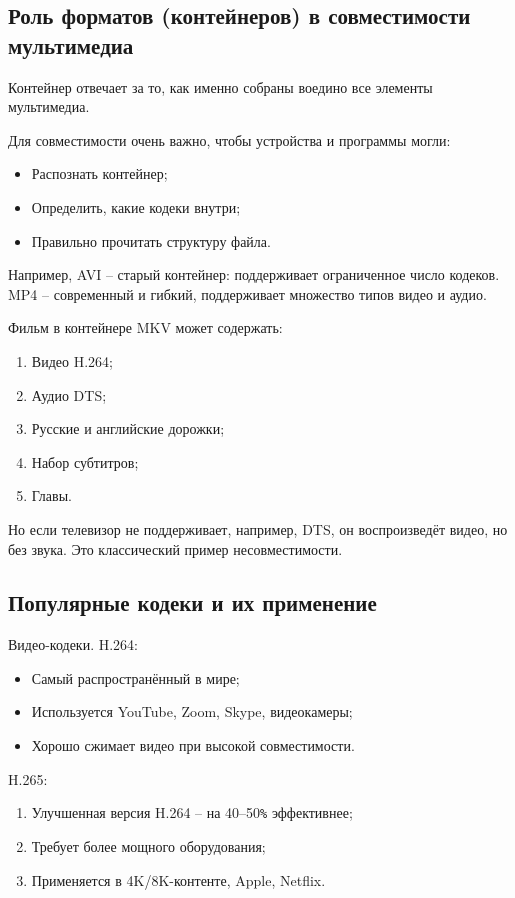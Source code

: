 \documentclass{ou}
\begin{document}
\subsection{Роль форматов (контейнеров) в совместимости мультимедиа}
Контейнер отвечает за то, как именно собраны воедино все элементы мультимедиа.

Для совместимости очень важно, чтобы устройства и программы могли:
\begin{itemize}[label=-, leftmargin=0em, itemindent=3.35em, nosep]
\item Распознать контейнер;
\item Определить, какие кодеки внутри;
\item Правильно прочитать структуру файла.
\end{itemize}

Например, AVI -- старый контейнер: поддерживает ограниченное число кодеков. MP4 -- современный и гибкий, поддерживает множество типов видео и аудио.

Фильм в контейнере MKV может содержать:
\begin{enumerate}[leftmargin=0em, itemindent=3.75em, nosep, label=\arabic*)]
\item Видео H.264;
\item Аудио DTS;
\item Русские и английские дорожки;
\item Набор субтитров;
\item Главы.
\end{enumerate}

Но если телевизор не поддерживает, например, DTS, он воспроизведёт видео, но без звука. Это классический пример несовместимости.
\subsection{Популярные кодеки и их применение}
Видео-кодеки. H.264:
\begin{itemize}[label=-, leftmargin=0em, itemindent=3.35em, nosep]
\item Самый распространённый в мире;
\item Используется YouTube, Zoom, Skype, видеокамеры;
\item Хорошо сжимает видео при высокой совместимости.
\end{itemize}

H.265:
\begin{enumerate}[leftmargin=0em, itemindent=3.75em, nosep, label=\arabic*)]
\item Улучшенная версия H.264 -- на 40–50\verb|%| эффективнее;
\item Требует более мощного оборудования;
\item Применяется в 4K/8K-контенте, Apple, Netflix.
\end{enumerate}
\end{document}

